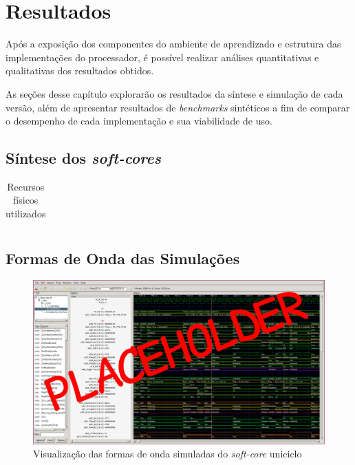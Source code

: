 \chapter{Resultados}\label{cap4_resultados}

{ Após a exposição dos componentes do ambiente de aprendizado e estrutura das
    implementações do processador, é possível realizar análises quantitativas
    e qualitativas dos resultados obtidos.
}

{ As seções desse capítulo explorarão os resultados da síntese e simulação de
    cada versão, além de apresentar resultados de \textit{benchmarks} sintéticos
    a fim de comparar o desempenho de cada implementação e sua viabilidade de uso.
}

\section{Síntese dos \textit{soft-cores}}
    {
    }
    \begin{longtable}{|l|}
        \caption{Recursos físicos utilizados}\label{table:synth_resources}\\
        \hline
        \hline
        \endfirsthead
        \hline
        \hline
        \endhead
        \hline
    \end{longtable}

\section{Formas de Onda das Simulações}
    {
    }

    \begin{figure}[H]
    \centering
        \includegraphics[width=0.9\linewidth]{../images/gtkwave/gtkwave_uni.png}
        \caption{Visualização das formas de onda simuladas do \textit{soft-core} uniciclo}
        \label{fig:gtkwave_uni}
    \end{figure}

